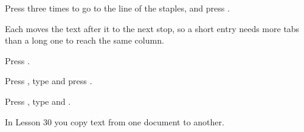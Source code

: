 \begin{WPSteps}
\item Press  three times to go to the line of the staples, and
press .
\end{WPSteps}
Each \Code{[Tab]} moves the text after it to the next stop, so a short entry
needs more tabs than a long one to reach the same column.
\begin{WPSteps}[resume]
\item Press .
\end{WPSteps}

\begin{WPSteps}[resume]
\item Press , type  and press
.
\item Press , type  and .
\end{WPSteps}
\EndReplay
In Lesson 30 you copy text from one document to another.
